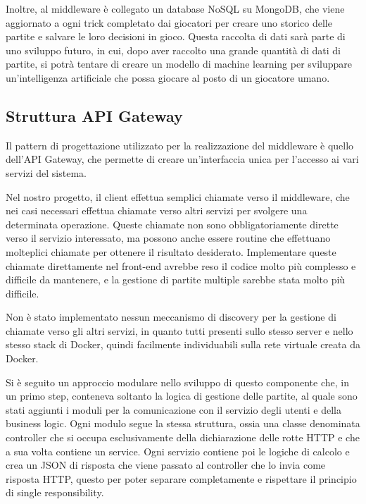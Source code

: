 Inoltre, al middleware è collegato un database NoSQL su MongoDB, che viene aggiornato a ogni trick completato dai giocatori per creare uno storico delle partite e salvare le loro decisioni in gioco. 
Questa raccolta di dati sarà parte di uno sviluppo futuro, in cui, dopo aver raccolto una grande quantità di dati di partite, si potrà tentare di creare un modello di machine learning per sviluppare un'intelligenza artificiale che possa giocare al posto di un giocatore umano.

\subsection{Struttura API Gateway}

Il pattern di progettazione utilizzato per la realizzazione del middleware è quello dell'API Gateway, che permette di creare un'interfaccia unica per l'accesso ai vari servizi del sistema.

Nel nostro progetto, il client effettua semplici chiamate verso il middleware, che nei casi necessari effettua chiamate verso altri servizi per svolgere una determinata operazione.
Queste chiamate non sono obbligatoriamente dirette verso il servizio interessato, ma possono anche essere routine che effettuano molteplici chiamate per ottenere il risultato desiderato. 
Implementare queste chiamate direttamente nel front-end avrebbe reso il codice molto più complesso e difficile da mantenere, e la gestione di partite multiple sarebbe stata molto più difficile.

\vspace{1cm}

Non è stato implementato nessun meccanismo di discovery per la gestione di chiamate verso gli altri servizi, in quanto tutti presenti sullo stesso server e nello stesso stack di Docker, quindi facilmente individuabili sulla rete virtuale creata da Docker.

\vspace{1cm}

Si è seguito un approccio modulare nello sviluppo di questo componente che, in un primo step, conteneva soltanto la logica di gestione delle partite, al quale sono stati aggiunti i moduli per la comunicazione con il servizio degli utenti e della business logic. Ogni modulo segue la stessa struttura, ossia una classe denominata controller che si occupa esclusivamente della dichiarazione delle rotte HTTP e che a sua volta contiene un service. Ogni servizio contiene poi le logiche di calcolo e crea un JSON di risposta che viene passato al controller che lo invia come risposta HTTP, questo per poter separare completamente e rispettare il principio di single responsibility.

